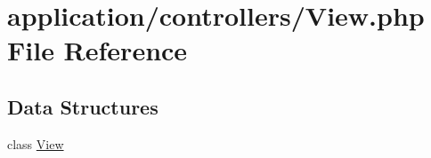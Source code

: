 \hypertarget{_view_8php}{}\section{application/controllers/\+View.php File Reference}
\label{_view_8php}
\subsection*{Data Structures}
\begin{DoxyCompactItemize}
\item 
class \mbox{\hyperlink{class_view}{View}}
\end{DoxyCompactItemize}
